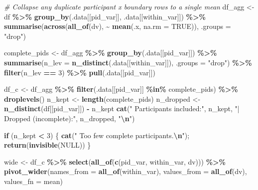 \documentclass[
]{article}
\newenvironment{Shaded}{\begin{snugshade}}{\end{snugshade}}
\newcommand{\AttributeTok}[1]{\textcolor[rgb]{0.13,0.29,0.53}{#1}}
\newcommand{\CommentTok}[1]{\textcolor[rgb]{0.56,0.35,0.01}{\textit{#1}}}
\newcommand{\ConstantTok}[1]{\textcolor[rgb]{0.56,0.35,0.01}{#1}}
\newcommand{\ControlFlowTok}[1]{\textcolor[rgb]{0.13,0.29,0.53}{\textbf{#1}}}
\newcommand{\DecValTok}[1]{\textcolor[rgb]{0.00,0.00,0.81}{#1}}
\newcommand{\FunctionTok}[1]{\textcolor[rgb]{0.13,0.29,0.53}{\textbf{#1}}}
\newcommand{\NormalTok}[1]{#1}
\newcommand{\OtherTok}[1]{\textcolor[rgb]{0.56,0.35,0.01}{#1}}
\newcommand{\SpecialCharTok}[1]{\textcolor[rgb]{0.81,0.36,0.00}{\textbf{#1}}}
\newcommand{\StringTok}[1]{\textcolor[rgb]{0.31,0.60,0.02}{#1}}
\begin{document}
\begin{Shaded}
\begin{Highlighting}[]
  \CommentTok{\# Collapse any duplicate participant x boundary rows to a single mean}
\NormalTok{  df\_agg }\OtherTok{\textless{}{-}}\NormalTok{ df }\SpecialCharTok{\%\textgreater{}\%}
    \FunctionTok{group\_by}\NormalTok{(.data[[pid\_var]], .data[[within\_var]]) }\SpecialCharTok{\%\textgreater{}\%}
    \FunctionTok{summarise}\NormalTok{(}\FunctionTok{across}\NormalTok{(}\FunctionTok{all\_of}\NormalTok{(dv), }\SpecialCharTok{\textasciitilde{}} \FunctionTok{mean}\NormalTok{(.x, }\AttributeTok{na.rm =} \ConstantTok{TRUE}\NormalTok{)), }\AttributeTok{.groups =} \StringTok{"drop"}\NormalTok{)}

\NormalTok{  complete\_pids }\OtherTok{\textless{}{-}}\NormalTok{ df\_agg }\SpecialCharTok{\%\textgreater{}\%}
    \FunctionTok{group\_by}\NormalTok{(.data[[pid\_var]]) }\SpecialCharTok{\%\textgreater{}\%}
    \FunctionTok{summarise}\NormalTok{(}\AttributeTok{n\_lev =} \FunctionTok{n\_distinct}\NormalTok{(.data[[within\_var]]), }\AttributeTok{.groups =} \StringTok{"drop"}\NormalTok{) }\SpecialCharTok{\%\textgreater{}\%}
    \FunctionTok{filter}\NormalTok{(n\_lev }\SpecialCharTok{==} \DecValTok{3}\NormalTok{) }\SpecialCharTok{\%\textgreater{}\%} \FunctionTok{pull}\NormalTok{(.data[[pid\_var]])}

\NormalTok{  df\_c      }\OtherTok{\textless{}{-}}\NormalTok{ df\_agg }\SpecialCharTok{\%\textgreater{}\%} \FunctionTok{filter}\NormalTok{(.data[[pid\_var]] }\SpecialCharTok{\%in\%}\NormalTok{ complete\_pids) }\SpecialCharTok{\%\textgreater{}\%} \FunctionTok{droplevels}\NormalTok{()}
\NormalTok{  n\_kept    }\OtherTok{\textless{}{-}} \FunctionTok{length}\NormalTok{(complete\_pids)}
\NormalTok{  n\_dropped }\OtherTok{\textless{}{-}} \FunctionTok{n\_distinct}\NormalTok{(df[[pid\_var]]) }\SpecialCharTok{{-}}\NormalTok{ n\_kept}
  \FunctionTok{cat}\NormalTok{(}\StringTok{"  Participants included:"}\NormalTok{, n\_kept, }\StringTok{"| Dropped (incomplete):"}\NormalTok{, n\_dropped, }\StringTok{"}\SpecialCharTok{\textbackslash{}n}\StringTok{"}\NormalTok{)}

  \ControlFlowTok{if}\NormalTok{ (n\_kept }\SpecialCharTok{\textless{}} \DecValTok{3}\NormalTok{) \{}
    \FunctionTok{cat}\NormalTok{(}\StringTok{"  Too few complete participants.}\SpecialCharTok{\textbackslash{}n}\StringTok{"}\NormalTok{); }\FunctionTok{return}\NormalTok{(}\FunctionTok{invisible}\NormalTok{(}\ConstantTok{NULL}\NormalTok{))}
\NormalTok{  \}}

\NormalTok{  wide }\OtherTok{\textless{}{-}}\NormalTok{ df\_c }\SpecialCharTok{\%\textgreater{}\%}
    \FunctionTok{select}\NormalTok{(}\FunctionTok{all\_of}\NormalTok{(}\FunctionTok{c}\NormalTok{(pid\_var, within\_var, dv))) }\SpecialCharTok{\%\textgreater{}\%}
    \FunctionTok{pivot\_wider}\NormalTok{(}\AttributeTok{names\_from =} \FunctionTok{all\_of}\NormalTok{(within\_var), }\AttributeTok{values\_from =} \FunctionTok{all\_of}\NormalTok{(dv),}
                \AttributeTok{values\_fn =}\NormalTok{ mean)}


\end{Highlighting}
\end{Shaded}
\end{document}
